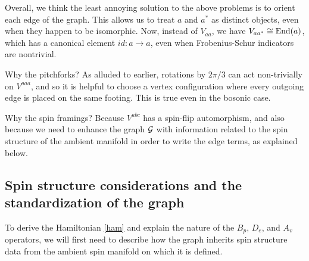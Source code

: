 Overall, we think the least annoying solution to the above problems is to orient each edge of the graph.
This allows us to treat $a$ and $a^*$ as distinct objects, even when they happen to be isomorphic.
Now, instead of $V_{aa}$, we have $V_{aa^*} \cong \text{End}(a)$, which has a canonical element $id: a\to a$,
even when Frobenius-Schur indicators are nontrivial.

Why the pitchforks? As alluded to earlier, rotations by $2\pi/3$ can act non-trivially on $V^{aaa}$, and so it is helpful to choose a vertex configuration where every outgoing edge is placed on the same footing. 
This is true even in the bosonic case.

Why the spin framings?
Because $V^{abc}$ has a spin-flip automorphism, and also because we need to 
enhance the graph $\mathcal{G}$ with information related to the spin structure of the ambient manifold 
in order to write the edge terms, as explained below.













\subsection{Spin structure considerations and the standardization of the graph} \label{standardized_handles}


To derive the Hamiltonian \eqref{ham} and explain the nature of the $B_p$, $D_e$, and $A_v$ operators, we will first need to describe how the graph inherits spin structure data from the ambient spin manifold on which it is defined. 


